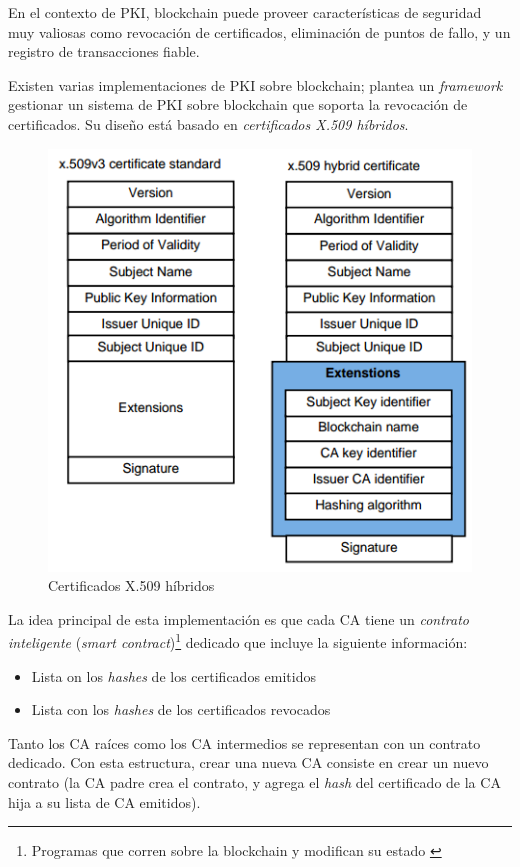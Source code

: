 En el contexto de PKI, blockchain puede proveer características de seguridad muy valiosas como revocación de certificados, eliminación de puntos de fallo, y un registro de transacciones fiable.

Existen varias implementaciones de PKI sobre blockchain; \autocite{BlockchainBasedPKIFramework} plantea un \emph{framework} gestionar un sistema de PKI sobre blockchain que soporta la revocación de certificados. Su diseño está basado en \emph{certificados X.509 híbridos}.

\begin{figure}[H]
    \centering
    \includegraphics[width=0.8\linewidth]{images/blockchain-pki-certificates.png}
    \caption*{Certificados X.509 híbridos \autocite{BlockchainBasedPKIFramework}}
\end{figure}

La idea principal de esta implementación es que cada CA tiene un \emph{contrato inteligente} (\emph{smart contract})\footnote{Programas que corren sobre la blockchain y modifican su estado \autocite{SmartContracts}} dedicado que incluye la siguiente información:

\begin{itemize}
    \item Lista on los \emph{hashes} de los certificados emitidos
    \item Lista con los \emph{hashes} de los certificados revocados
\end{itemize}

Tanto los CA raíces como los CA intermedios se representan con un contrato dedicado. Con esta estructura, crear una nueva CA consiste en crear un nuevo contrato (la CA padre crea el contrato, y agrega el \emph{hash} del certificado de la CA hija a su lista de CA emitidos).

